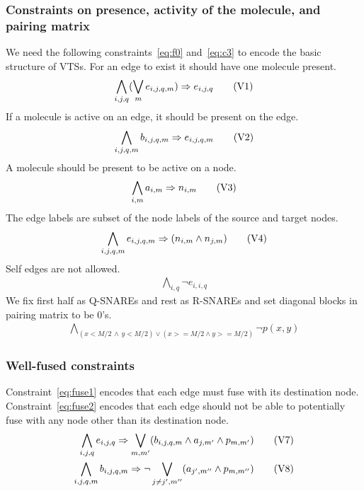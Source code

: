 \subsubsection{Constraints on presence, activity of the molecule, and pairing matrix}
%
We need the following constraints~\eqref{eq:f0} and~\eqref{eq:c3}
to encode the basic structure of VTSs.
%
For an edge to exist it should have one molecule present. 
%
\begin{align}
  \bigwedge\limits_{i,j,q} (\bigvee_m e_{i,j,q,m} )\Rightarrow e_{i,j,q}\tag{V1}\label{eq:f0}
\end{align}
If a molecule is active on an edge, it should be present on the edge.
%
\begin{align}
  \bigwedge\limits_{i,j,q,m} b_{i,j,q,m} \Rightarrow e_{i,j,q,m}\tag{V2}\label{eq:f1}
\end{align}
A molecule should be present to be active on a node.  
\begin{align}
  \bigwedge\limits_{i,m} a_{i,m} \Rightarrow n_{i,m}
  \tag{V3}\label{eq:c4}
\end{align}
The edge labels are subset of the node labels of the source and target nodes.
\begin{align}
  \bigwedge\limits_{i,j,q,m} e_{i,j,q,m} \Rightarrow (n_{i,m} \land n_{j,m} )\tag{V4}\label{eq:c0}
\end{align}
Self edges are not allowed. 
\begin{align}
   \bigwedge\limits_{i,q} \neg e_{i,i,q}\tag{V5}\label{eq:c2}
\end{align}
We fix first half as Q-SNAREs and rest as R-SNAREs and set diagonal blocks in pairing matrix to be 0's.
\begin{align}
  \bigwedge\limits_{(x < M/2 \, \land  \, y < M/2) \lor  (x >= M/2 \land y >= M/2)} \neg p(x,y)
  \tag{V6}\label{eq:c3}
\end{align}

\subsubsection{Well-fused constraints}
Constraint~\eqref{eq:fuse1} encodes that each edge must fuse with
its destination node.
%
Constraint~\eqref{eq:fuse2} encodes that each edge should not
be able to potentially fuse with any node other than its destination node.
\begin{align}
  \bigwedge\limits_{i,j,q} e_{i,j,q} \Rightarrow \bigvee_{m,m^{\prime}} (b_{i,j,q,m} \land a_{j,m^{\prime}} \land p_{m,m^{\prime}})
  \tag{V7}\label{eq:fuse1}  \\
\bigwedge\limits_{i,j,q,m} b_{i,j,q,m} \Rightarrow \neg \bigvee_{j \neq j^{\prime}, m^{\prime\prime}} ( a_{j^{\prime},m^{\prime\prime}} \land p_{m,m^{\prime\prime}})
  \tag{V8}\label{eq:fuse2}  
\end{align}


